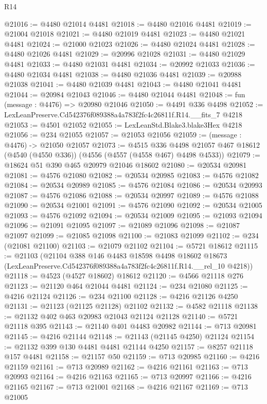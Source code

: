 \begin{lexlean}{R14}
\begin{coremodule}
@21016 := @4480 @21014 @4481
@21018 := @4480 @21016 @4481
@21019 := @21004 @21018
@21021 := @4480 @21019 @4481
@21023 := @4480 @21021 @4481
@21024 := @21000 @21023
@21026 := @4480 @21024 @4481
@21028 := @4480 @21026 @4481
@21029 := @20996 @21028
@21031 := @4480 @21029 @4481
@21033 := @4480 @21031 @4481
@21034 := @20992 @21033
@21036 := @4480 @21034 @4481
@21038 := @4480 @21036 @4481
@21039 := @20988 @21038
@21041 := @4480 @21039 @4481
@21043 := @4480 @21041 @4481
@21044 := @20984 @21043
@21046 := @4480 @21044 @4481
@21048 := fun (message : @4476) => @20980 @21046
@21050 := @4491 @336 @4498
@21052 := LexLeanPreserve.Cd542376f089388a4a783f2fc4c26811f.R14.__fits_7 @4218
@21053 := @4501 @21052
@21055 := LexLeanStd.Blake3.blake3Hex @4218
@21056 := @234 @21055
@21057 := @21053 @21056
@21059 := (message : @4476) -> @21050 @21057
@21073 := @4515
    @336
    @4498
    @21057
    @467
    @18612
    (@4540 (@4550 @336))
    (@4556 (@4557 (@4558 @467) @4498 @4533))
@21079 := @18624 @51 @390 @465 @20979 @21046 @18602
@21080 := @20534 @20981
@21081 := @4576 @21080
@21082 := @20534 @20985
@21083 := @4576 @21082
@21084 := @20534 @20989
@21085 := @4576 @21084
@21086 := @20534 @20993
@21087 := @4576 @21086
@21088 := @20534 @20997
@21089 := @4576 @21088
@21090 := @20534 @21001
@21091 := @4576 @21090
@21092 := @20534 @21005
@21093 := @4576 @21092
@21094 := @20534 @21009
@21095 := @21093 @21094
@21096 := @21091 @21095
@21097 := @21089 @21096
@21098 := @21087 @21097
@21099 := @21085 @21098
@21100 := @21083 @21099
@21102 := @234 (@21081 @21100)
@21103 := @21079 @21102
@21104 := @5721 @18612
@21115 := @21103
    (@21104
      @388
      @146
      @4483
      @18598
      @4498
      @18602
      @18673
      (LexLeanPreserve.Cd542376f089388a4a783f2fc4c26811f.R14.__rel_10 @4218))
@21118 := @4523 (@4527 @18602) @18612
@21120 := @4566 @21118 @276
@21123 := @21120 @464 @21044 @4481
@21124 := @234 @21080
@21125 := @4216 @21124
@21126 := @234 @21100
@21128 := @4216 @21126 @4250
@21131 := @21123 (@21125 @21128) @21102
@21132 := @4582 @21118
@21138 := @21132 @402 @463 @20983 @21043 @21124 @21128
@21140 := @5721 @21118 @395
@21143 := @21140 @401 @4483 @20982
@21144 := @713 @20981
@21145 := @4216 @21144
@21148 := @21143 (@21145 @4250) @21124
@21154 := @21132 @399 @130 @4481 @4481 @21144 @4250
@21157 := @8257 @21118 @157 @4481
@21158 := @21157 @50
@21159 := @713 @20985
@21160 := @4216 @21159
@21161 := @713 @20989
@21162 := @4216 @21161
@21163 := @713 @20993
@21164 := @4216 @21163
@21165 := @713 @20997
@21166 := @4216 @21165
@21167 := @713 @21001
@21168 := @4216 @21167
@21169 := @713 @21005

\end{coremodule}
\end{lexlean}
